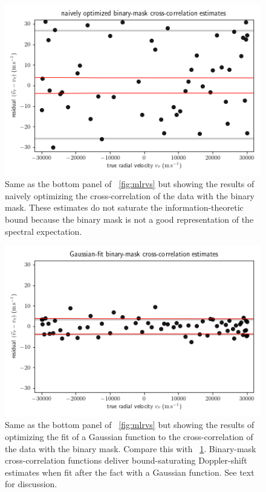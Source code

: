 \documentclass[modern]{aastex631}
\newcommand{\figref}[1]{\figurename~\ref{#1}}
\begin{document}
\begin{figure}[tp]
  \begin{mdframed}
    \begin{center}
    \includegraphics[width=\textwidth]{../notebook/bccfrvswrong.png}
    \end{center}
    \caption{Same as the bottom panel of \figref{fig:mlrvs} but showing the results of naively optimizing the cross-correlation of the data with the binary mask. These estimates do not saturate the information-theoretic bound because the binary mask is not a good representation of the spectral expectation.\label{fig:bccfrvswrong}}
  \end{mdframed}
\end{figure}%
\begin{figure}[tp]
  \begin{mdframed}
    \begin{center}
    \includegraphics[width=\textwidth]{../notebook/bccfrvs.png}
    \end{center}
    \caption{Same as the bottom panel of \figref{fig:mlrvs} but showing the results of optimizing the fit of a Gaussian function to the cross-correlation of the data with the binary mask. Compare this with \figref{fig:bccfrvswrong}. Binary-mask cross-correlation functions deliver bound-saturating Doppler-shift estimates when fit after the fact with a Gaussian function. See text for discussion.\label{fig:bccfrvs}}
  \end{mdframed}
\end{figure}
\end{document}
